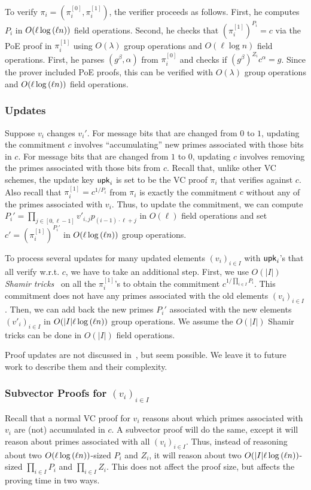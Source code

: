 To verify $\pi_i = (\pi_{i}^{[0]}, \pi_i^{[1]})$, the verifier proceeds as follows.
First, he computes $P_i$ in $O(\ell\log{(\ell n)})$ field operations.
Second, he checks that $\left(\pi_i^{[1]}\right)^{P_i} = c$ via the PoE proof in $\pi_i^{[1]}$ using $O(\lambda)$ group operations and $O(\ell\log{n})$ field operations.
First, he parses $(g^{\beta}, \alpha)$ from $\pi_i^{[0]}$ and checks if $(g^{\beta})^{Z_i} c^\alpha=g$.
Since the prover included PoE proofs, this can be verified with $O(\lambda)$ group operations and $O(\ell\log{(\ell n)})$ field operations.

\subsubsection{Updates}
\label{s:complexity-bbf:proof-updates}

Suppose $v_i$ changes $v_i'$.
For message bits that are changed from $0$ to $1$, updating the commitment $c$ involves ``accumulating'' new primes associated with those bits in $c$.
For message bits that are changed from $1$ to $0$, updating $c$ involves removing the primes associated with those bits from $c$.
Recall that, unlike other VC schemes, the update key $\mathsf{upk}_i$ is set to be the VC proof $\pi_i$ that verifies against $c$.
Also recall that $\pi_i^{[1]}=c^{1/P_i}$ from $\pi_i$ is exactly the commitment $c$ without any of the primes associated with $v_i$.
Thus, to update the commitment, we can compute $P_i'=\prod_{j\in [0,\ell-1]} v'_{i,j} p_{(i-1)\cdot\ell + j}$ in $O(\ell)$ field operations and set $c' = \left(\pi_i^{[1]}\right)^{P_i'}$ in $O(\ell \log{(\ell n)})$ group operations.

To process several updates for many updated elements $(v_i)_{i\in I}$ with $\mathsf{upk}_i$'s that all verify w.r.t. $c$, we have to take an additional step.
First, we use $O(|I|)$ \textit{Shamir tricks}~\cite{BBF18} on all the $\pi_i^{[1]}$'s to obtain the commitment $c^{1/\prod_{i\in I} P_i}$.
This commitment does not have any primes associated with the old elements $(v_i)_{i\in I}$.
Then, we can add back the new primes $P_i'$ associated with the new elements $(v'_i)_{i\in I}$ in $O(|I|\ell \log{(\ell n)})$ group operations.
We assume the $O(|I|)$ Shamir tricks can be done in $O(|I|)$ field operations.

Proof updates are not discussed in~\cite{BBF19}, but seem possible.
We leave it to future work to describe them and their complexity.

\subsubsection{Subvector Proofs for $(v_i)_{i\in I}$}
Recall that a normal VC proof for $v_i$ reasons about which primes associated with $v_i$ are (not) accumulated in $c$.
A subvector proof will do the same, except it will reason about primes associated with all $(v_i)_{i\in I}$.
Thus, instead of reasoning about two $O(\ell \log{(\ell n)})$-sized $P_i$ and $Z_i$, it will reason about two $O(|I|\ell\log{(\ell n)})$-sized $\prod_{i\in I} P_i$ and $\prod_{i\in I} Z_i$.
This does not affect the proof size, but affects the proving time in two ways.

